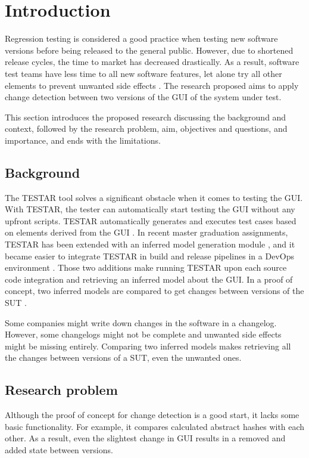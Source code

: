 \section{Introduction} \label{intoduction}

Regression testing is considered a good practice when testing new software versions before being released to the general public. 
However, due to shortened release cycles, the time to market has decreased drastically. As a result, software test teams have less time to all new software features, let alone try all other elements to prevent unwanted side effects \cite{rapid-release-cycle-issues}.
The research proposed aims to apply change detection between two versions of the GUI of the system under test. 

This section introduces the proposed research discussing the background and context, followed by the research problem, aim, objectives and questions, and importance, and ends with the limitations. 

\subsection{Background}
The TESTAR tool solves a significant obstacle when it comes to testing the GUI. With TESTAR, the tester can automatically start testing the GUI without any upfront scripts. TESTAR automatically generates and executes test cases based on elements derived from the GUI \cite{VosAho2021}. In recent master graduation assignments, TESTAR has been extended with an inferred model generation module \cite{thesisMulders}, and it became easier to integrate TESTAR in build and release pipelines in a DevOps environment \cite{thesisSlomp}. Those two additions make running TESTAR upon each source code integration and retrieving an inferred model about the GUI. In a proof of concept, two inferred models are compared to get changes between versions of the SUT \cite{stateDiff}.

Some companies might write down changes in the software in a changelog. However, some changelogs might not be complete and unwanted side effects might be missing entirely. Comparing two inferred models makes retrieving all the changes between versions of a SUT, even the unwanted ones.

\subsection{Research problem}
Although the proof of concept for change detection is a good start, it lacks some basic functionality. For example, it compares calculated abstract hashes with each other. As a result, even the slightest change in GUI results in a removed and added state between versions.

